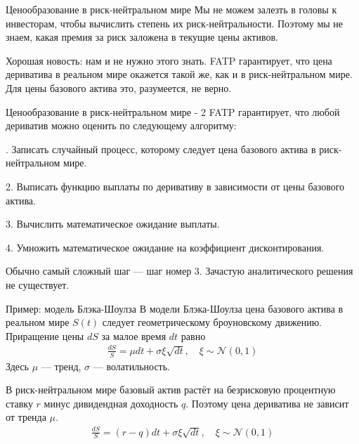 \documentclass{beamer}
\begin{document}
\begin{frame}{Ценообразование в риск-нейтральном мире}
\justify
Мы не можем залезть в головы к инвесторам, чтобы вычислить степень их риск-нейтральности. Поэтому мы не знаем, какая премия за риск заложена в текущие цены активов.

\justify
Хорошая новость: нам и не нужно этого знать. FATP гарантирует, что цена дериватива в реальном мире окажется такой же, как и в риск-нейтральном мире. Для цены базового актива это, разумеется, не верно.
\end{frame}



\begin{frame}{Ценообразование в риск-нейтральном мире - 2}
\justify
FATP гарантирует, что любой дериватив можно оценить 	по следующему алгоритму:

. Записать случайный процесс, которому следует цена базового актива в риск-нейтральном мире.

2. Выписать функцию выплаты по деривативу в зависимости от цены базового актива.

3. Вычислить математическое ожидание выплаты.

4. Умножить математическое ожидание на коэффициент дисконтирования.

\justify
Обычно самый сложный шаг --- шаг номер 3. Зачастую аналитического решения не существует.
\end{frame}



\begin{frame}{Пример: модель Блэка-Шоулза}
\justify
В модели Блэка-Шоулза цена базового актива в реальном мире $S(t)$ следует геометрическому броуновскому движению. Приращение цены $dS$ за малое время $dt$ равно
\begin{align*}
\frac{dS}{S} = \mu dt + \sigma  \xi \sqrt{dt}, \quad \xi \sim \mathcal{N}(0,1) 
\end{align*}
Здесь $\mu$ --- тренд, $\sigma$ --- волатильность.

\justify
В риск-нейтральном мире базовый актив растёт на безрисковую процентную ставку $r$ минус дивидендная доходность $q$. Поэтому цена дериватива не зависит от тренда $\mu$.
\begin{align*}
\frac{dS}{S} = (r-q) dt + \sigma \xi \sqrt{dt} , \quad \xi \sim \mathcal{N}(0,1) 
\end{align*}
\end{frame}
\end{document}
